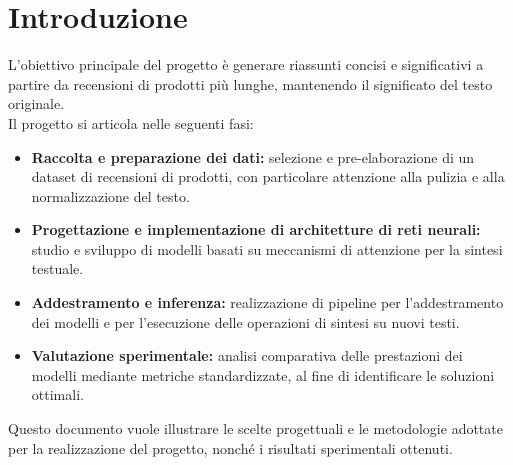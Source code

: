 \section{Introduzione}
L'obiettivo principale del progetto è generare riassunti concisi e significativi a partire da recensioni di prodotti più lunghe, mantenendo il significato del testo originale.\\
Il progetto si articola nelle seguenti fasi:
\begin{itemize}
    \item \textbf{Raccolta e preparazione dei dati:} selezione e pre-elaborazione di un dataset di recensioni di prodotti, con particolare attenzione alla pulizia e alla normalizzazione del testo.
    \item \textbf{Progettazione e implementazione di architetture di reti neurali:} studio e sviluppo di modelli basati su meccanismi di attenzione per la sintesi testuale.
    \item \textbf{Addestramento e inferenza:} realizzazione di pipeline per l'addestramento dei modelli e per l'esecuzione delle operazioni di sintesi su nuovi testi.
    \item \textbf{Valutazione sperimentale:} analisi comparativa delle prestazioni dei modelli mediante metriche standardizzate, al fine di identificare le soluzioni ottimali.
\end{itemize}
Questo documento vuole illustrare le scelte progettuali e le metodologie adottate per la realizzazione del progetto, nonché i risultati sperimentali ottenuti.